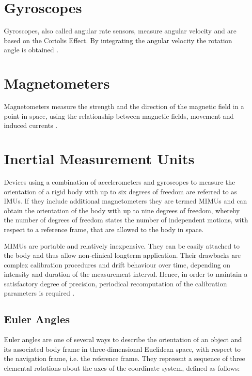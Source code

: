 \section{Gyroscopes}

Gyroscopes, also called angular rate sensors, measure angular velocity and are based on the Coriolis Effect. By integrating the angular velocity the rotation angle is obtained \cite{olivares_vicente_signal_2013}.

\section{Magnetometers}

Magnetometers measure the strength and the direction of the magnetic field in a point in space, using the relationship between magnetic fields, movement and induced currents \cite{olivares_vicente_signal_2013}.

\section{Inertial Measurement Units}

Devices using a combination of accelerometers and gyroscopes to measure the orientation of a rigid body with up to six degrees of freedom are referred to as \glspl{IMU}. If they include additional magnetometers they are termed \glspl{MIMU} and can obtain the orientation of the body with up to nine degrees of freedom, whereby the number of degrees of freedom states the number of independent motions, with respect to a reference frame, that are allowed to the body in space.

\glspl{MIMU} are portable and relatively inexpensive. They can be easily attached to the body and thus allow non-clinical longterm application. Their drawbacks are complex calibration procedures and drift behaviour over time, depending on intensity and duration of the measurement interval. Hence, in order to maintain a satisfactory degree of precision, periodical recomputation of the calibration parameters is required \cite{olivares_vicente_signal_2013}.

\subsection{Euler Angles}

Euler angles are one of several ways to describe the orientation of an object and its associated body frame in three-dimensional Euclidean space, with respect to the navigation frame, i.e. the reference frame. They represent a sequence of three elemental rotations about the axes of the coordinate system, defined as follows:

